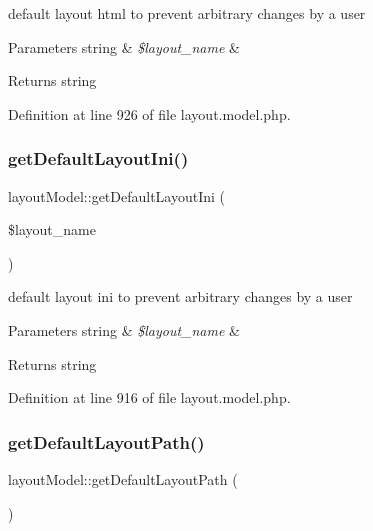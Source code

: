 default layout html to prevent arbitrary changes by a user 
\begin{DoxyParams}[1]{Parameters}
string & {\em \$layout\+\_\+name} & \\
\hline
\end{DoxyParams}
\begin{DoxyReturn}{Returns}
string 
\end{DoxyReturn}


Definition at line 926 of file layout.\+model.\+php.

\mbox{\label{classlayoutModel_a983d5b4ff865d15ee237385b1c82b5e5}} 
\subsubsection{\texorpdfstring{get\+Default\+Layout\+Ini()}{getDefaultLayoutIni()}}
{\footnotesize\ttfamily layout\+Model\+::get\+Default\+Layout\+Ini (\begin{DoxyParamCaption}\item[{}]{\$layout\+\_\+name }\end{DoxyParamCaption})}

default layout ini to prevent arbitrary changes by a user 
\begin{DoxyParams}[1]{Parameters}
string & {\em \$layout\+\_\+name} & \\
\hline
\end{DoxyParams}
\begin{DoxyReturn}{Returns}
string 
\end{DoxyReturn}


Definition at line 916 of file layout.\+model.\+php.

\mbox{\label{classlayoutModel_a446c397aaf30fa592cba675f2fbb9495}} 
\subsubsection{\texorpdfstring{get\+Default\+Layout\+Path()}{getDefaultLayoutPath()}}
{\footnotesize\ttfamily layout\+Model\+::get\+Default\+Layout\+Path (\begin{DoxyParamCaption}{ }\end{DoxyParamCaption})}

